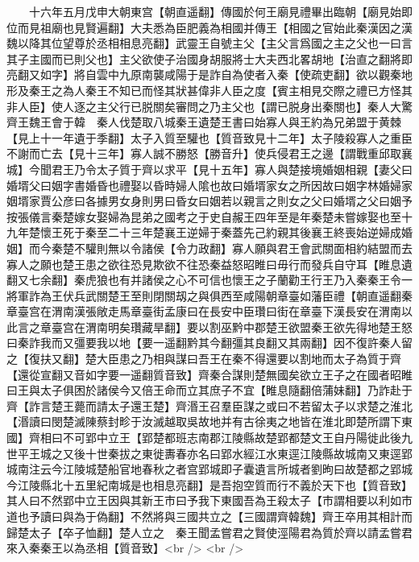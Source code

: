 　　十六年五月戊申大朝東宫【朝直遥翻】傳國於何王廟見禮畢出臨朝【廟見始即位而見祖廟也見賢遍翻】大夫悉為臣肥義為相國并傳王【相國之官始此秦漢因之漢魏以降其位望尊於丞相相息亮翻】武靈王自號主父【主父言爲國之主之父也一曰言其子主國而已則父也】主父欲使子治國身胡服將士大夫西北畧胡地【治直之翻將即亮翻又如字】將自雲中九原南襲咸陽于是詐自為使者入秦【使疏吏翻】欲以觀秦地形及秦王之為人秦王不知已而怪其狀甚偉非人臣之度【賓主相見交際之禮已方怪其非人臣】使人逐之主父行已脱關矣審問之乃主父也【謂已脱身出秦關也】秦人大驚　齊王魏王會于韓　秦人伐楚取八城秦王遺楚王書曰始寡人與王約為兄弟盟于黄棘【見上十一年遺于季翻】太子入質至驩也【質音致見十二年】太子陵殺寡人之重臣不謝而亡去【見十三年】寡人誠不勝怒【勝音升】使兵侵君王之邊【謂戰重邱取襄城】今聞君王乃令太子質于齊以求平【見十五年】寡人與楚接境婚姻相親【妻父曰婚壻父曰姻字書婚昏也禮娶以昏時婦人隂也故曰婚壻家女之所因故曰姻字林婚婦家姻壻家賈公彦曰各據男女身則男曰昏女曰姻若以親言之則女之父曰婚壻之父曰姻予按張儀言秦楚嫁女娶婦為昆弟之國考之于史自赧王四年至是年秦楚未嘗嫁娶也至十九年楚懷王死于秦至二十三年楚襄王逆婦于秦蓋先己約親其後襄王終喪始逆婦成婚姻】而今秦楚不驩則無以令諸侯【令力政翻】寡人願與君王會武關面相約結盟而去寡人之願也楚王患之欲往恐見欺欲不往恐秦益怒昭睢曰毋行而發兵自守耳【睢息遺翻又七余翻】秦虎狼也有并諸侯之心不可信也懷王之子蘭勸王行王乃入秦秦王令一將軍詐為王伏兵武關楚王至則閉關刼之與俱西至咸陽朝章臺如藩臣禮【朝直遥翻秦章臺宫在渭南漢張敞走馬章臺街孟康曰在長安中臣瓚曰街在章臺下漢長安在渭南以此言之章臺宫在渭南明矣瓚藏旱翻】要以割巫黔中郡楚王欲盟秦王欲先得地楚王怒曰秦詐我而又彊要我以地【要一遥翻黔其今翻彊其良翻又其兩翻】因不復許秦人留之【復扶又翻】楚大臣患之乃相與謀曰吾王在秦不得還要以割地而太子為質于齊【還從宣翻又音如字要一遥翻質音致】齊秦合謀則楚無國矣欲立王子之在國者昭睢曰王與太子俱困於諸侯今又倍王命而立其庶子不宜【睢息隨翻倍蒲妹翻】乃詐赴于齊【詐言楚王薨而請太子還王楚】齊湣王召羣臣謀之或曰不若留太子以求楚之淮北【湣讀曰閔楚滅陳蔡封畛于汝滅越取吳故地并有古徐夷之地皆在淮北即楚所謂下東國】齊相曰不可郢中立王【郢楚都班志南郡江陵縣故楚郢都楚文王自丹陽徙此後九世平王城之又後十世秦拔之東徙夀春亦名曰郢水經江水東逕江陵縣故城南又東逕郢城南注云今江陵城楚船官地春秋之者宫郢城即子囊遺言所城者劉昫曰故楚都之郢城今江陵縣北十五里紀南城是也相息亮翻】是吾抱空質而行不義於天下也【質音致】其人曰不然郢中立王因與其新王市曰予我下東國吾為王殺太子【市謂相要以利如市道也予讀曰與為于偽翻】不然將與三國共立之【三國謂齊韓魏】齊王卒用其相計而歸楚太子【卒子恤翻】楚人立之　秦王聞孟嘗君之賢使涇陽君為質於齊以請孟嘗君來入秦秦王以為丞相【質音致】<br />
<br />

